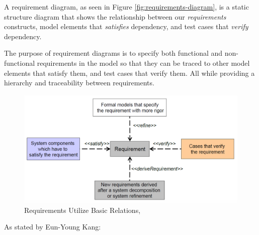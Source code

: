 A requirement diagram, as seen in Figure \ref{fig:requirements-diagram}, is a static structure diagram that shows the relationship between our \textit{requirements} constructs, model elements that \textit{satisfies} dependency, and test cases that \textit{verify} dependency.

The purpose of requirement diagrams is to specify both functional and non-functional requirements in the model so that they can be traced to other model elements that satisfy them, and test cases that verify them. All while providing a hierarchy and traceability between requirements.

\begin{figure}[H]
    \centering
    \caption{Requirements Utilize Basic Relations, \cite{WormKangLec72024}}
    \label{fig:requirement-diagram-relations}
    \includegraphics[width=0.9\linewidth]{images/Requirements basic relations.png}
\end{figure}
As stated by Eun-Young Kang:

